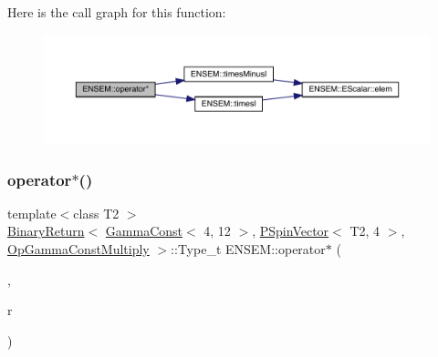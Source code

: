 Here is the call graph for this function\+:\nopagebreak
\begin{figure}[H]
\begin{center}
\leavevmode
\includegraphics[width=350pt]{dd/d6d/group__primspinvector_ga4bbdc1bc935fc4378105903d7b0fb65d_cgraph}
\end{center}
\end{figure}
\mbox{\label{group__primspinvector_gacda74bfacd9c872e7d821f2355890a01}} 
\subsubsection{\texorpdfstring{operator$\ast$()}{operator*()}\hspace{0.1cm}{\footnotesize\ttfamily [13/32]}}
{\footnotesize\ttfamily template$<$class T2 $>$ \\
\mbox{\hyperlink{structENSEM_1_1BinaryReturn}{Binary\+Return}}$<$ \mbox{\hyperlink{classENSEM_1_1GammaConst}{Gamma\+Const}}$<$ 4, 12 $>$, \mbox{\hyperlink{classENSEM_1_1PSpinVector}{P\+Spin\+Vector}}$<$ T2, 4 $>$, \mbox{\hyperlink{structENSEM_1_1OpGammaConstMultiply}{Op\+Gamma\+Const\+Multiply}} $>$\+::Type\+\_\+t E\+N\+S\+E\+M\+::operator$\ast$ (\begin{DoxyParamCaption}\item[{const \mbox{\hyperlink{classENSEM_1_1GammaConst}{Gamma\+Const}}$<$ 4, 12 $>$ \&}]{,  }\item[{const \mbox{\hyperlink{classENSEM_1_1PSpinVector}{P\+Spin\+Vector}}$<$ T2, 4 $>$ \&}]{r }\end{DoxyParamCaption})\hspace{0.3cm}{\ttfamily [inline]}}

